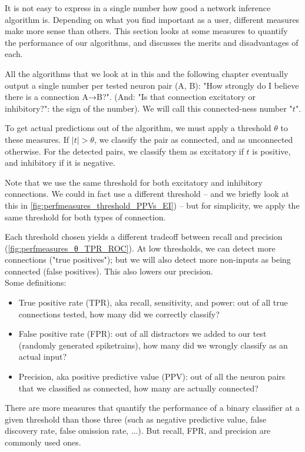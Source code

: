 It is not easy to express in a single number how good a network inference algorithm is. Depending on what you find important as a user, different measures make more sense than others. This section looks at some measures to quantify the performance of our algorithms, and discusses the merits and disadvantages of each.

All the algorithms that we look at in this and the following chapter eventually output a single number per tested neuron pair (A, B): "How strongly do I believe there is a connection A→B?". (And: "Is that connection excitatory or inhibitory?": the sign of the number). We will call this connected-ness number "$t$".

To get actual predictions out of the algorithm,
we must apply a threshold $θ$ to these measures. If $|t| > θ$, we classify the pair as connected, and as unconnected otherwise. For the detected pairs, we classify them as excitatory if $t$ is positive, and inhibitory if it is negative.

Note that we use the same threshold for both excitatory and inhibitory connections. We could in fact use a different threshold -- and we briefly look at this in \cref{fig:perfmeasures_threshold_PPVs_EI}) -- but for simplicity, we apply the same threshold for both types of connection.

Each threshold chosen yields a different tradeoff between recall and precision (\cref{fig:perfmeasures_θ_TPR_ROC}). At low thresholds, we can detect more connections ("true positives"); but we will also detect more non-inputs as being connected (false positives). This also lowers our precision.\\
Some definitions:
\begin{itemize}
    \item True positive rate (TPR), aka recall, sensitivity, and power: out of all true connections tested, how many did we correctly classify?
    \item False positive rate (FPR): out of all distractors we added to our test (randomly generated spiketrains), how many did we wrongly classify as an actual input?
    \item Precision, aka positive predictive value (PPV): out of all the neuron pairs that we classified as connected, how many are actually connected?
\end{itemize}

There are more measures that quantify the performance of a binary classifier at a given threshold than those three (such as negative predictive value, false discovery rate, false omission rate, ...).\footnotemark{}
But recall, FPR, and precision are commonly used ones.

